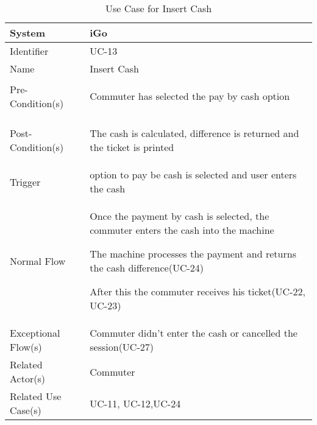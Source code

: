 \begin{table}[ht]
    \centering
    \begin{tabular}{|l|p{11cm}|}
        \hline
        System             & iGo\\
        \hline
        Identifier         & UC-13 \\
        \hline
        Name               & Insert Cash \\
        \hline
        Pre-Condition(s)   & 
        \begin{enumerate*}[itemjoin=\newline]
            \item Commuter has selected the pay by cash option
        \end{enumerate*} \\
        \hline
        Post-Condition(s)  & 
        \begin{enumerate*}[itemjoin=\newline]
            \item The cash is calculated, difference is returned and the ticket is printed
        \end{enumerate*} \\
        \hline
        Trigger            & option to pay be cash is selected and user enters the cash \\
        \hline
        Normal Flow        & 
        \begin{enumerate*}[itemjoin=\newline]
            \item Once the payment by cash is selected, the commuter enters the cash into the machine
            \item The machine processes the payment and returns the cash difference(UC-24)
            \item After this the commuter receives his ticket(UC-22, UC-23)
        \end{enumerate*} \\
        \hline
        Exceptional Flow(s)& Commuter didn't enter the cash or cancelled the session(UC-27)\\
        \hline
        Related Actor(s)   & Commuter\\
        \hline
        Related Use Case(s)& UC-11, UC-12,UC-24\\
        \hline
    \end{tabular}
    \caption{Use Case for Insert Cash}
    \label{tab:UC_InsertCash}
\end{table}
